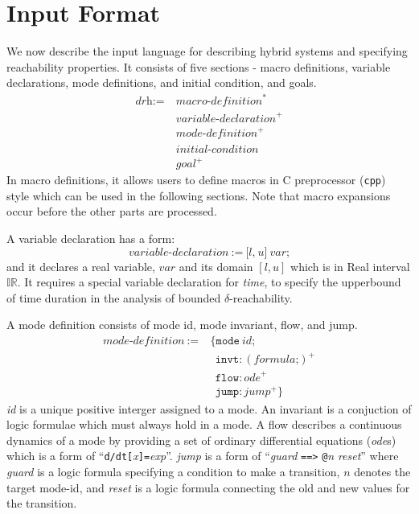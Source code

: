 \section{Input Format}

We now describe the input language for describing hybrid systems and
specifying reachability properties. It consists of five sections
- macro definitions, variable declarations, mode definitions, and
initial condition, and goals.
\begin{align*}
  \textit{drh} := \ & \textit{macro-definition}^*\\
                    & \textit{variable-declaration}^+\\
                    & \textit{mode-definition}^+\\
                    & \textit{initial-condition}\\
                    & \textit{goal}^+
\end{align*}
In macro definitions, it allows users to define macros in C
preprocessor (\texttt{cpp}) style which can be used in the following
sections. Note that macro expansions occur before the other parts are processed.

A variable declaration has a form:
\[
\textit{variable-declaration} \ := \ \texttt{[}
                                     \textit{l}
                                     \texttt{,}
                                     \ \textit{u}
                                     \texttt{]}
                                     \ \textit{var}
                                     \texttt{;}
\]
and it declares a real variable, $var$ and its domain $[l, u]$ which
is in Real interval $\mathbb{IR}$. It requires a special variable
declaration for \textit{time}, to specify the upperbound of time
duration in the analysis of bounded $\delta$-reachability.

A mode definition consists of mode id, mode invariant, flow, and jump.
\begin{align*}
  \textit{mode-definition} \ := & \ \texttt{\{}
                                    \texttt{mode} \ \textit{id}\texttt{;}\\
                           & \ \ \  \texttt{invt}:(\textit{formula} \texttt{;})^+\\
                           & \ \ \  \texttt{flow}:\textit{ode}^+\\
                           & \ \ \ \texttt{jump}:\textit{jump}^+ \texttt{\}}
\end{align*}
\textit{id} is a unique positive interger assigned to a mode. An
invariant is a conjuction of logic formulae which must always hold in
a mode. A flow describes a continuous dynamics of a mode by providing
a set of ordinary differential equations (\textit{ode}s) which is a
form of
``\texttt{d/dt[}\textit{x}\texttt{]=}\textit{exp}''. \textit{jump} is
a form of ``\textit{guard} \texttt{==>} \texttt{@}\textit{n}
\textit{reset}'' where \textit{guard} is a logic formula specifying a
condition to make a transition, $n$ denotes the target mode-id, and
\textit{reset} is a logic formula connecting the old and new values
for the transition.

